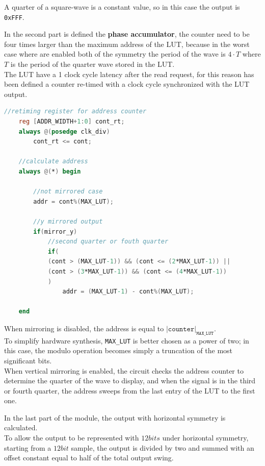 \noindent
A quarter of a square-wave is a constant value, so in this case the output is \texttt{0xFFF}.

\newpage
\noindent
In the second part is defined the \textbf{phase accumulator}, the counter need to be four times larger than the maximum address of the LUT, because in the worst case where are enabled both of the symmetry the period of the wave is \(4 \cdot T\) where \(T\) is the period of the quarter wave stored in the LUT. \\
The LUT have a 1 clock cycle latency after the read request, for this reason has been defined a counter re-timed with a clock cycle synchronized with the LUT output.

\vspace{1cm}
\begin{lstlisting}[language=Verilog, caption=Address calculation with vertical mirroring, 
label=lst:DDFS_address ]
    //retiming register for address counter
    reg [ADDR_WIDTH+1:0] cont_rt;
    always @(posedge clk_div)
        cont_rt <= cont;
    
    //calculate address
    always @(*) begin
        
        //not mirrored case
        addr = cont%(MAX_LUT);
        
        //y mirrored output
        if(mirror_y)
            //second quarter or fouth quarter
            if(
            (cont > (MAX_LUT-1)) && (cont <= (2*MAX_LUT-1)) ||
            (cont > (3*MAX_LUT-1)) && (cont <= (4*MAX_LUT-1))
            )
                addr = (MAX_LUT-1) - cont%(MAX_LUT);
                
    end
\end{lstlisting}
\vspace{1cm}

\noindent
When mirroring is disabled, the address is equal to \(|\texttt{counter}|_{\texttt{MAX\_LUT}}\). \\
To simplify hardware synthesis, \texttt{MAX\_LUT} is better chosen as a power of two; in this case, the modulo operation becomes simply a truncation of the most significant bits. \\
When vertical mirroring is enabled, the circuit checks the address counter to determine the quarter of the wave to display, and when the signal is in the third or fourth quarter, the address sweeps from the last entry of the LUT to the first one.

\vspace{\baselineskip}

\noindent
In the last part of the module, the output with horizontal symmetry is calculated. \\
To allow the output to be represented with \(12 bits\) under horizontal symmetry, starting from a \(12 bit\) sample, the output is divided by two and summed with an offset constant equal to half of the total output swing.


